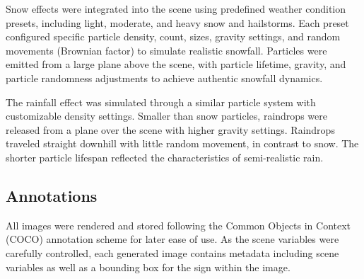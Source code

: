 \documentclass[journal]{IEEEtran}
\begin{document}
Snow effects were integrated into the scene using predefined weather condition presets, including light, moderate, and heavy snow and hailstorms. Each preset configured specific particle density, count, sizes, gravity settings, and random movements (Brownian factor) to simulate realistic snowfall. Particles were emitted from a large plane above the scene, with particle lifetime, gravity, and particle randomness adjustments to achieve authentic snowfall dynamics.

The rainfall effect was simulated through a similar particle system with customizable density settings. Smaller than snow particles, raindrops were released from a plane over the scene with higher gravity settings. Raindrops traveled straight downhill with little random movement, in contrast to snow. The shorter particle lifespan reflected the characteristics of semi-realistic rain.

\subsection{Annotations}
All images were rendered and stored following the Common Objects in Context (COCO) annotation scheme for later ease of use\cite{COCO}. As the scene variables were carefully controlled, each generated image contains metadata including scene variables as well as a bounding box for the sign within the image. 
\end{document}
